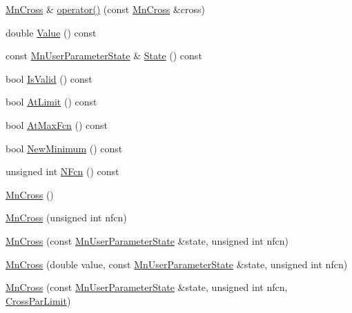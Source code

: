 \begin{DoxyCompactItemize}
\mbox{\hyperlink{classROOT_1_1Minuit2_1_1MnCross}{Mn\+Cross}} \& \mbox{\hyperlink{classROOT_1_1Minuit2_1_1MnCross_a12f4058d5a3b758cbaa68a0a9bc0cebb}{operator()}} (const \mbox{\hyperlink{classROOT_1_1Minuit2_1_1MnCross}{Mn\+Cross}} \&cross)
\item 
double \mbox{\hyperlink{classROOT_1_1Minuit2_1_1MnCross_af7cebab3edb3fedaf0e4ce0704e1196f}{Value}} () const
\item 
const \mbox{\hyperlink{classROOT_1_1Minuit2_1_1MnUserParameterState}{Mn\+User\+Parameter\+State}} \& \mbox{\hyperlink{classROOT_1_1Minuit2_1_1MnCross_a97ba8e698ee948a842f0ebe198c0d528}{State}} () const
\item 
bool \mbox{\hyperlink{classROOT_1_1Minuit2_1_1MnCross_a9cee17151ec7e078fc6efbfa32120a1a}{Is\+Valid}} () const
\item 
bool \mbox{\hyperlink{classROOT_1_1Minuit2_1_1MnCross_a01119708c6c9aa2a5b16222705cad954}{At\+Limit}} () const
\item 
bool \mbox{\hyperlink{classROOT_1_1Minuit2_1_1MnCross_a785c82249ecae395a16536cfc64aa610}{At\+Max\+Fcn}} () const
\item 
bool \mbox{\hyperlink{classROOT_1_1Minuit2_1_1MnCross_aaf90f3645fb5fcc67b49ffd24f4a12ba}{New\+Minimum}} () const
\item 
unsigned int \mbox{\hyperlink{classROOT_1_1Minuit2_1_1MnCross_a52cc0559ea27a2d8fe3f9961670e1544}{N\+Fcn}} () const
\item 
\mbox{\hyperlink{classROOT_1_1Minuit2_1_1MnCross_a34d52c2c171319eb9f25c688ab8021f0}{Mn\+Cross}} ()
\item 
\mbox{\hyperlink{classROOT_1_1Minuit2_1_1MnCross_a7f93187035c85b5c2adf78d00c0d0052}{Mn\+Cross}} (unsigned int nfcn)
\item 
\mbox{\hyperlink{classROOT_1_1Minuit2_1_1MnCross_acbfb3f4507d15112537609f68ad36c29}{Mn\+Cross}} (const \mbox{\hyperlink{classROOT_1_1Minuit2_1_1MnUserParameterState}{Mn\+User\+Parameter\+State}} \&state, unsigned int nfcn)
\item 
\mbox{\hyperlink{classROOT_1_1Minuit2_1_1MnCross_a4b4c9d92105b2517789094d86eecee57}{Mn\+Cross}} (double value, const \mbox{\hyperlink{classROOT_1_1Minuit2_1_1MnUserParameterState}{Mn\+User\+Parameter\+State}} \&state, unsigned int nfcn)
\item 
\mbox{\hyperlink{classROOT_1_1Minuit2_1_1MnCross_aea436e84ebb882f376cfdc90b8846660}{Mn\+Cross}} (const \mbox{\hyperlink{classROOT_1_1Minuit2_1_1MnUserParameterState}{Mn\+User\+Parameter\+State}} \&state, unsigned int nfcn, \mbox{\hyperlink{classROOT_1_1Minuit2_1_1MnCross_1_1CrossParLimit}{Cross\+Par\+Limit}})

\end{DoxyCompactItemize}
